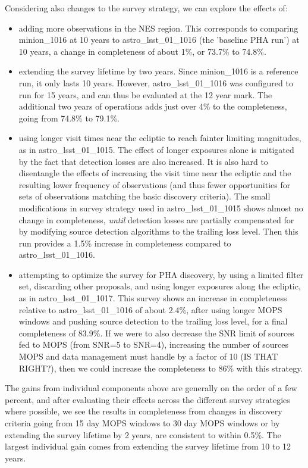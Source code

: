 Considering also changes to the survey strategy, we can explore the effects of:
\begin{itemize}
\item adding more observations in the NES region. This corresponds to comparing minion\_1016 at 10 years to astro\_lsst\_01\_1016 (the 'baseline PHA run') at 10 years, a change in completeness of about 1\%, or 73.7\% to 74.8\%. 
\item extending the survey lifetime by two years. Since minion\_1016 is a reference run, it only lasts 10 years. However, astro\_lsst\_01\_1016 was configured to run for 15 years, and can thus be evaluated at the 12 year mark. The additional two years of operations adds just over 4\% to the completeness, going from 74.8\% to 79.1\%. 
\item using longer visit times near the ecliptic to reach fainter limiting magnitudes, as in astro\_lsst\_01\_1015. The effect of longer exposures alone is mitigated by the fact that detection losses are also increased. It is also hard to disentangle the effects of increasing the visit time near the ecliptic and the resulting lower frequency of observations (and thus fewer opportunities for sets of observations matching the basic discovery criteria). The small modifications in survey strategy used in astro\_lsst\_01\_1015 shows almost no change in completeness, {\it until} detection losses are partially compensated for by modifying source detection algorithms to the trailing loss level. Then this run provides a 1.5\% increase in completeness compared to astro\_lsst\_01\_1016. 
\item attempting to optimize the survey for PHA discovery, by using a limited filter set, discarding other proposals, and using longer exposures along the ecliptic, as in astro\_lsst\_01\_1017. This survey shows an increase in completeness relative to astro\_lsst\_01\_1016 of about 2.4\%, after using longer MOPS windows and pushing source detection to the trailing loss level, for a final completeness of 83.9\%. If we were to also decrease the SNR limit of sources fed to MOPS (from SNR=5 to SNR=4), increasing the number of sources MOPS and data management must handle by a factor of 10 (IS THAT RIGHT?), then we could increase the completeness to 86\% with this strategy.
\end{itemize}

The gains from individual components above are generally on the order of a few percent, and after evaluating their effects across the different survey strategies where possible, we see the results in completeness from changes in discovery criteria going from 15 day MOPS windows to 30 day MOPS windows or by extending the survey lifetime by 2 years, are consistent to within 0.5\%. The largest individual gain comes from extending the survey lifetime from 10 to 12 years. 

